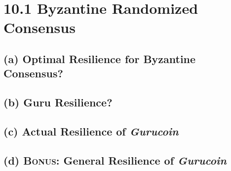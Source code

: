\documentclass{article}
\begin{document}
	\pagestyle{fancy}
	\section*{10.1 Byzantine Randomized Consensus}
	\begin{adjustwidth}{2em}{2em}
		\subsection*{(a) Optimal Resilience for Byzantine Consensus?}
		\begin{adjustwidth}{2em}{2em}
		\end{adjustwidth}
		\subsection*{(b) Guru Resilience?}
		\begin{adjustwidth}{2em}{2em}
		\end{adjustwidth}
		\subsection*{(c) Actual Resilience of \textit{Gurucoin}}
		\begin{adjustwidth}{2em}{2em}
		\end{adjustwidth}
		\subsection*{(d) \textsc{Bonus:} General Resilience of \textit{Gurucoin}}
		\begin{adjustwidth}{2em}{2em}
		\end{adjustwidth}
	\end{adjustwidth}
\end{document}
